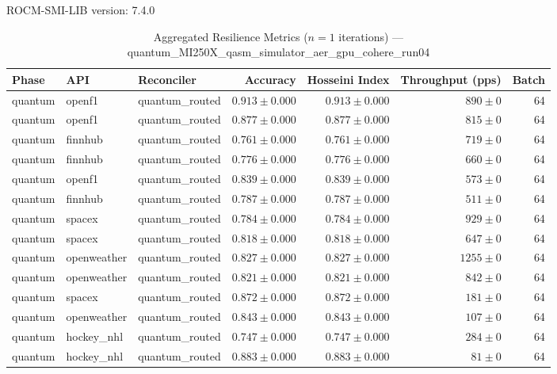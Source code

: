 ROCM-SMI-LIB version: 7.4.0

\begin{table}[htbp]
\caption{Aggregated Resilience Metrics ($n=1$ iterations) --- quantum_MI250X_qasm_simulator_aer_gpu_cohere_run04}
\begin{tabular}{l l l r r r r}
\hline
Phase & API & Reconciler & Accuracy & Hosseini Index & Throughput (pps) & Batch \\
\hline
quantum & openf1 & quantum\_routed & $0.913\pm0.000$ & $0.913\pm0.000$ & $890\pm0$ & 64 \\
quantum & openf1 & quantum\_routed & $0.877\pm0.000$ & $0.877\pm0.000$ & $815\pm0$ & 64 \\
quantum & finnhub & quantum\_routed & $0.761\pm0.000$ & $0.761\pm0.000$ & $719\pm0$ & 64 \\
quantum & finnhub & quantum\_routed & $0.776\pm0.000$ & $0.776\pm0.000$ & $660\pm0$ & 64 \\
quantum & openf1 & quantum\_routed & $0.839\pm0.000$ & $0.839\pm0.000$ & $573\pm0$ & 64 \\
quantum & finnhub & quantum\_routed & $0.787\pm0.000$ & $0.787\pm0.000$ & $511\pm0$ & 64 \\
quantum & spacex & quantum\_routed & $0.784\pm0.000$ & $0.784\pm0.000$ & $929\pm0$ & 64 \\
quantum & spacex & quantum\_routed & $0.818\pm0.000$ & $0.818\pm0.000$ & $647\pm0$ & 64 \\
quantum & openweather & quantum\_routed & $0.827\pm0.000$ & $0.827\pm0.000$ & $1255\pm0$ & 64 \\
quantum & openweather & quantum\_routed & $0.821\pm0.000$ & $0.821\pm0.000$ & $842\pm0$ & 64 \\
quantum & spacex & quantum\_routed & $0.872\pm0.000$ & $0.872\pm0.000$ & $181\pm0$ & 64 \\
quantum & openweather & quantum\_routed & $0.843\pm0.000$ & $0.843\pm0.000$ & $107\pm0$ & 64 \\
quantum & hockey\_nhl & quantum\_routed & $0.747\pm0.000$ & $0.747\pm0.000$ & $284\pm0$ & 64 \\
quantum & hockey\_nhl & quantum\_routed & $0.883\pm0.000$ & $0.883\pm0.000$ & $81\pm0$ & 64 \\

\end{tabular}
\end{table}
